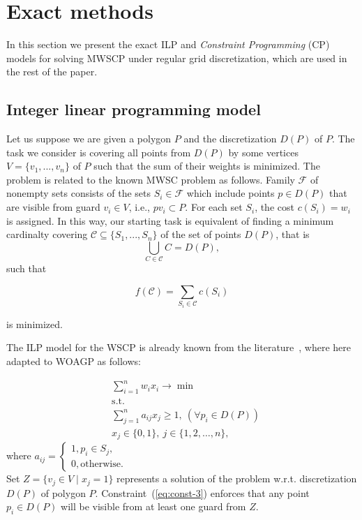 \documentclass[runningheads,a4paper]{elsarticle}
\begin{document}
	\section{Exact methods}
	In this section we present the exact ILP and \emph{Constraint Programming} (CP) models for solving MWSCP  under regular grid discretization, which are used  in the rest of the paper.
	\subsection{Integer linear programming model}
	Let us suppose we are given a polygon $P$ and the discretization $D(P)$ of $P$.  The task we consider is covering all points from $D(P)$ by some vertices $V=\{v_1,...,v_n\}$ of $P$ such that the sum of their weights is minimized.
	The problem is related to the known MWSC problem as follows.
	Family $\mathcal{F}$ of nonempty sets consists of the sets
	$S_i \in \mathcal{F}$ which include points $p \in D(P)$ that are visible from guard $v_i\in V$, i.e., $pv_i \subset P$.  For each set $S_i$, the cost $c(S_i) = w_i$ is assigned.  In this way, our starting task is equivalent of finding a minimum cardinalty covering $\mathcal{C}\subseteq\{S_1,...,S_n\}$ of the set of points $D(P)$, that is
	$$ \bigcup_{C \in \mathcal{C}} C = D(P),$$ such that 

$$f(\mathcal{C}) = \sum_{S_i \in \mathcal{C}} c(S_i)$$ 

is minimized.  

The ILP  model for the WSCP is already known from the literature~\cite{vazirani2013approximation}, where  here adapted to WOAGP  as follows:

	\begin{align}
	&\sum_{i=1}^n w_ix_i \longrightarrow \min  \label{eq:woagp-min}\\
	&\mbox{s.t.}\nonumber \\
	&\sum_{j=1}^n a_{ij}x_j \geq 1,\ (\forall p_i\in D(P)) \label{eq:const-3}\\
	& x_j \in \{0,1\},\ j\in\{1,2,\ldots,n\}\label{eq:const-4},
	\end{align}
	where
	$a_{ij} = \begin{cases}
	1, p_i \in S_j, \\
	0, \mbox{otherwise}.
	\end{cases}$
	 \\

	Set $Z = \{v_j \in V\mid x_j=1\}$ represents a solution of the problem w.r.t. discretization $D(P)$ of polygon $P$.
	Constraint~(\ref{eq:const-3}) enforces that any point $p_i \in D(P)$ will be visible from at least one guard from $Z$.
	
\end{document}
